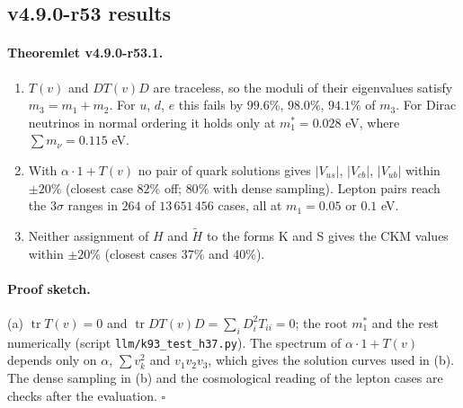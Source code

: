 \subsection*{v4.9.0-r53 results}
\label{subsec:v490-r53-results}

\paragraph{Theoremlet v4.9.0-r53.1.}
\begin{enumerate}[leftmargin=2em]
\item[(a)] \(T(v)\) and \(DT(v)D\) are traceless, so the moduli of their eigenvalues satisfy \(m_3=m_1+m_2\).  For \(u\), \(d\), \(e\) this fails by
\(99.6\%\), \(98.0\%\), \(94.1\%\) of \(m_3\).  For Dirac neutrinos in normal ordering it holds only at \(m_1^*=0.028\) eV, where
\(\sum m_\nu=0.115\) eV.
\item[(b)] With \(\alpha\cdot1+T(v)\) no pair of quark solutions gives \(|V_{us}|\), \(|V_{cb}|\), \(|V_{ub}|\) within \(\pm20\%\) (closest case
\(82\%\) off; \(80\%\) with dense sampling).  Lepton pairs reach the \(3\sigma\) ranges in \(264\) of \(13\,651\,456\) cases, all at \(m_1=0.05\) or
\(0.1\) eV.
\item[(c)] Neither assignment of \(H\) and \(\tilde H\) to the forms K and S gives the CKM values within \(\pm20\%\) (closest cases \(37\%\) and
\(40\%\)).
\end{enumerate}

\paragraph{Proof sketch.}
(a) \(\operatorname{tr}T(v)=0\) and \(\operatorname{tr}DT(v)D=\sum_iD_i^2T_{ii}=0\); the root \(m_1^*\) and the rest numerically (script
\texttt{llm/k93\_test\_h37.py}).  The spectrum of \(\alpha\cdot1+T(v)\) depends only on \(\alpha\), \(\sum v_k^2\) and \(v_1v_2v_3\), which gives the
solution curves used in (b).  The dense sampling in (b) and the cosmological reading of the lepton cases are checks after the evaluation.  \(\square\)

